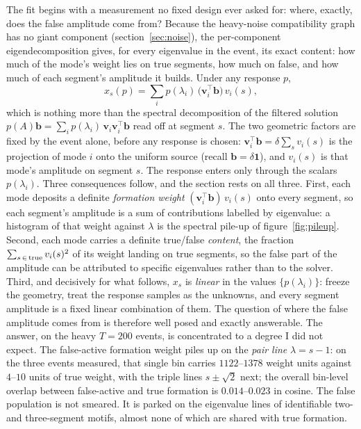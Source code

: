 \documentclass[11pt,a4paper]{article}
\begin{document}
The fit begins with a measurement no fixed design ever asked for:
where, exactly, does the false amplitude come from? Because
the heavy-noise compatibility graph has no giant component
(section~\ref{sec:noise}), the per-component eigendecomposition
gives, for every eigenvalue in the event, its exact content: how
much of the mode's weight lies on true segments, how much on false,
and how much of each segment's amplitude it builds. Under any
response $p$,
\begin{equation}
x_s(p)=\sum_i p(\lambda_i)\,\big(\mathbf{v}_i^{\!\top}\mathbf{b}\big)\,
v_i(s),
\label{eq:linresponse}
\end{equation}
which is nothing more than the spectral decomposition of the
filtered solution $p(A)\mathbf{b}=\sum_i
p(\lambda_i)\,\mathbf{v}_i\mathbf{v}_i^{\!\top}\mathbf{b}$ read off
at segment $s$. The two geometric factors are fixed by the event
alone, before any response is chosen: $\mathbf{v}_i^{\!\top}
\mathbf{b}=\delta\sum_s v_i(s)$ is the projection of mode $i$ onto
the uniform source (recall $\mathbf{b}=\delta\mathbf{1}$), and
$v_i(s)$ is that mode's amplitude on segment $s$. The response
enters only through the scalars $p(\lambda_i)$. Three consequences
follow, and the section rests on all three. First, each mode
deposits a definite \emph{formation weight}
$(\mathbf{v}_i^{\!\top}\mathbf{b})\,v_i(s)$ onto every segment, so
each segment's amplitude is a sum of contributions labelled by
eigenvalue: a histogram of that weight against $\lambda$ is the
spectral pile-up of figure~\ref{fig:pileup}. Second, each mode
carries a definite true/false \emph{content}, the fraction
$\sum_{s\,\in\,\rm true} v_i(s)^2$ of its weight landing on true
segments, so the false part of the amplitude can be attributed to
specific eigenvalues rather than to the solver. Third, and
decisively for what follows, $x_s$ is \emph{linear} in the values
$\{p(\lambda_i)\}$: freeze the geometry, treat the response samples
as the unknowns, and every segment amplitude is a fixed linear
combination of them. The question of where the false amplitude
comes from is therefore well posed and exactly answerable. The
answer, on the heavy
$T=200$ events, is concentrated to a degree I did not expect. The
false-active formation weight piles up on the \emph{pair line}
$\lambda=s-1$: on the three events measured, that single bin carries
$1122$--$1378$ weight units against $4$--$10$ units of true weight,
with the triple lines $s\pm\sqrt2$ next; the overall bin-level
overlap between false-active and true formation is $0.014$--$0.023$
in cosine. The false population is not smeared. It is parked on the
eigenvalue lines of identifiable two- and three-segment motifs,
almost none of which are shared with true formation.
\end{document}
